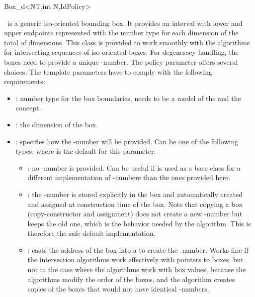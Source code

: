 

\begin{ccRefClass}{Box_d<NT,int N,IdPolicy>}
\ccDefinition

\ccRefName\ is a generic iso-oriented bounding box. It provides an
interval with lower and upper endpoints represented with the number
type  for each dimension of the total of  dimensions.
This class is provided to work smoothly with the algorithms for
intersecting sequences of iso-oriented boxes. For degeneracy handling,
the boxes need to provide a unique -number. The policy
parameter  offers several choices. The template
parameters have to comply with the following requirements:

\begin{itemize}
  \item
    : number type for the box boundaries, needs to be a model
    of the  and the  concept.
  \item
    : the dimension of the box.
  \item
    : specifies how the -number will be
    provided. Can be one of the following types, where
     is the default for this parameter:
    \begin{itemize}
      \item
        : no -number is provided. Can be useful
        if  is used as a base class for a different
        implementation of -numbers than the ones provided
        here.
      \item
        : the -number is stored explicitly in
        the box and automatically created and assigned at construction
        time of the box. Note that copying a box (copy-constructor and
        assignment) does not create a new -number but keeps
        the old one, which is the behavior needed by the
         algorithm. This is therefore
        the safe default implementation. 
      \item
        : casts the address of the box into a
         to create the -number. Works fine 
        if the intersection algorithms work effectively with pointers
        to boxes, but not in the case where the algorithms work with
        box values, because the algorithms modify the order of the
        boxes, and the  algorithm
        creates copies of the boxes that would not have identical
        -numbers.  
    \end{itemize}
\end{itemize}


\end{ccRefClass}
